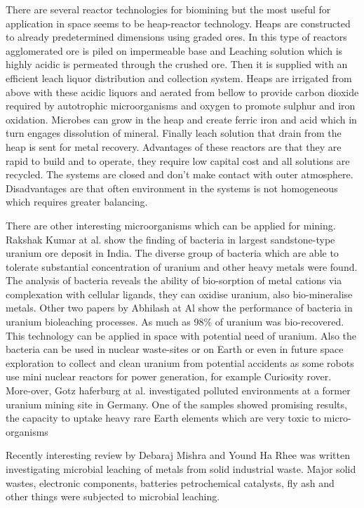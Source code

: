 \documentclass[12pt]{article}
\begin{document}
There are several reactor technologies for biomining but the most useful for application in space seems to be heap-reactor technology. Heaps are constructed to already predetermined dimensions using graded ores. In this type of reactors agglomerated ore is piled on impermeable base and Leaching solution which is highly acidic is permeated through the crushed ore. Then it is supplied with an efficient leach liquor distribution and collection system. Heaps are irrigated
from above with these acidic liquors and aerated from bellow to provide carbon dioxide required by autotrophic microorganisms and oxygen to promote sulphur and iron oxidation. Microbes can grow in the heap and create ferric iron and acid which in turn engages dissolution of mineral.\cite{} Finally leach solution that drain from the heap is sent for metal recovery. Advantages of these reactors are that they are rapid to build and to operate, they require low capital cost and all solutions are recycled. The systems are closed and don’t make contact with
outer atmosphere. Disadvantages are that often environment in the systems is not homogeneous which requires greater balancing.

\todo

There are other interesting microorganisms which can be applied for mining. Rakshak Kumar at al. show the finding of bacteria in largest sandstone-type uranium ore deposit in India.\cite{} The diverse group of bacteria which are able to tolerate substantial concentration of uranium and other heavy metals were found. The analysis of bacteria reveals the ability of bio-sorption of
metal cations via complexation with cellular ligands, they can oxidise uranium, also bio-mineralise metals. Other two papers by Abhilash at Al show the performance of bacteria in uranium bioleaching processes. As much as 98\% of uranium was bio-recovered. This technology can be applied in space with potential need of uranium. Also the bacteria can be used in nuclear waste-sites or on Earth or even in future space exploration to collect and clean
uranium from potential accidents as some robots use mini nuclear reactors for power generation, for example Curiosity rover. More-over, Gotz haferburg at al. investigated polluted environments at a former uranium mining site in Germany. One of the samples showed promising results, the capacity to uptake heavy rare Earth elements which are very toxic to micro-organisms

Recently interesting review by Debaraj Mishra and Yound Ha Rhee was written investigating microbial leaching of metals from solid industrial waste. Major solid wastes, electronic components, batteries petrochemical catalysts, fly ash and other things were subjected to microbial leaching.
\end{document}
